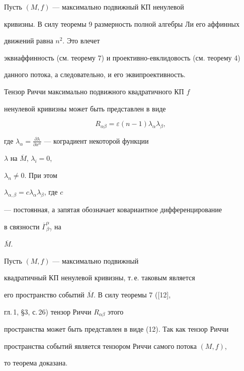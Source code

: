 \begin{pf}


Пусть $(M,f) $ --- максимально подвижный КП ненулевой


кривизны. В силу теоремы 9 размерность полной алгебры Ли его аффинных


движений равна $n^2$. Это влечет


эквиаффинность (см. теорему 7) и проективно-евклидовость (см. теорему 4)


данного потока, а следовательно, и его эквипроективность.


\end{pf}





\begin{lem}


Тензор Риччи максимально подвижного квадратичного КП $f$


ненулевой кривизны может быть представлен в виде


\begin{equation}


R_{\alpha \beta}


=\varepsilon(n-1)\lambda_{\alpha}\lambda_{\beta},


\end{equation}


где $\lambda_{\alpha} =\frac{\partial


\lambda }{\partial x^{\alpha}}$ --- коградиент некоторой функции


$\lambda $ на $\overline{M} $, $\lambda_i=0$,


$\lambda_n\neq 0$. При этом


$\lambda_{\alpha,\beta}=c\lambda_{\alpha}\lambda_{\beta}$, где $c$


--- постоянная, а запятая обозначает ковариантное дифференцирование


в связности $\overline{\Gamma}^{\alpha}_{\beta \gamma}$ на


$\overline{M} $.


\end{lem}





\begin{pf}


Пусть $(M,f) $ --- максимально подвижный


квадратичный КП ненулевой кривизны, т.\,е. таковым является


его пространство событий $\overline{M} $. В силу теоремы 7 ([12],


гл.\,1, \S 3, с.\,26) тензор Риччи $R_{\alpha\beta}$ этого


пространства может быть представлен в виде (12). Так как тензор Риччи


пространства событий является тензором Риччи самого потока $(M,f)$,


то теорема доказана.


\end{pf}





